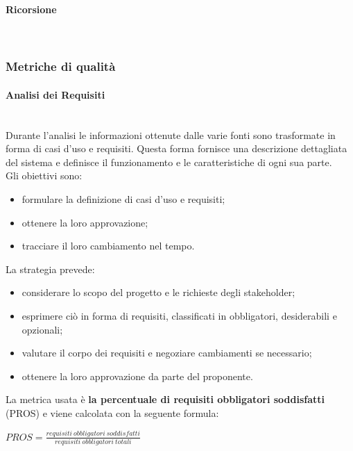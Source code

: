 \paragraph*{Ricorsione}  \mbox{}\\


\subsubsection{Metriche di qualità}
\paragraph*{Analisi dei Requisiti} \mbox{}\\

\noindent Durante l'analisi le informazioni ottenute dalle varie fonti sono trasformate in forma di casi d'uso e requisiti. Questa forma fornisce una descrizione dettagliata del sistema e definisce il funzionamento e le caratteristiche di ogni sua parte. \\
Gli obiettivi sono:
\begin{itemize}
	\item formulare la definizione di casi d'uso e requisiti;
	\item ottenere la loro approvazione;
	\item tracciare il loro cambiamento nel tempo.
\end{itemize}
La strategia prevede: 
\begin{itemize}
	\item considerare lo scopo del progetto e le richieste degli stakeholder;
	\item esprimere ciò in forma di requisiti, classificati in obbligatori, desiderabili e opzionali;
	\item valutare il corpo dei requisiti e negoziare cambiamenti se necessario;
	\item ottenere la loro approvazione da parte del proponente.
\end{itemize}
La metrica usata è \textbf{la percentuale di requisiti obbligatori soddisfatti} (PROS) e viene calcolata con la seguente formula:

\begin{center}  $ PROS = \frac{requisiti\ obbligatori\ soddisfatti}{requisiti\ obbligatori\ totali}$
\end{center}

